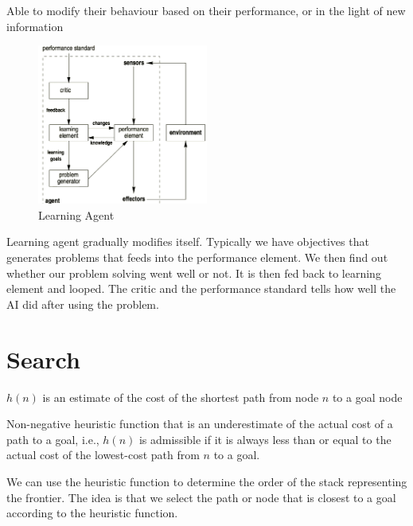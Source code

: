 \documentclass[a4paper]{article}
\theoremstyle{plain}
\theoremstyle{definition}
\newtheorem{defn}{Definition}[section]
\theoremstyle{remark}
\begin{document}
\begin{tcolorbox}[colback=black!3!white,colframe=black!60!white,title=\begin{defn}Learning agents \label{Learning agents}\end{defn}]
Able to modify their behaviour based on their performance, or in the light of new information
\begin{figure}[H]
	\centering
	\includegraphics[width=0.5\textwidth]{8.png}
	\caption{Learning Agent}
	\label{fig:8-png}
\end{figure}
	Learning agent gradually modifies itself. Typically we have objectives that generates problems that feeds into the performance element. We then find out whether our problem solving went well or not. It is then fed back to learning element and looped. The critic and the performance standard tells how well the AI did after using the problem. 
\end{tcolorbox}
\section{Search}
\begin{tcolorbox}[colback=black!3!white,colframe=black!60!white,title=\begin{defn}Heuristic Search \label{Heuristic Search}\end{defn}]
$h(n)$ is an estimate of the cost of the shortest path from node $n$ to a goal node
\end{tcolorbox}
\begin{tcolorbox}[colback=black!3!white,colframe=black!60!white,title=\begin{defn}Admissible Heuristic \label{Admissible Heuristic}\end{defn}]
Non-negative heuristic function that is an underestimate of the actual cost of a path to a goal, i.e., $h(n)$ is admissible if it is always less than or equal to the actual cost of the lowest-cost path from $n$ to a goal.
\end{tcolorbox}
We can use the heuristic function to determine the order of the stack representing the frontier. The idea is that we select the path or node that is closest to a goal according to the heuristic function.
\end{document}
